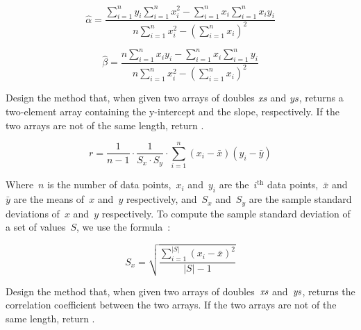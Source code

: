 \[
    \hat\alpha = \frac{\sum_{i=1}^{n}y_i \sum_{i=1}^{n}x_i^2 - \sum_{i=1}^{n}x_i \sum_{i=1}^{n}x_i{}y_i}{n  \sum_{i=1}^{n}x_i^2 - \left(\sum_{i=1}^{n}x_i\right)^2}
\]

\[
    \hat{\beta} = \frac{n \sum_{i=1}^{n}x_i{}y_i - \sum_{i=1}^{n}x_i \sum_{i=1}^{n}y_i}{n \sum_{i=1}^{n}x_i^2 - \left(\sum_{i=1}^{n}x_i\right)^2}
\]

Design the  method that, when given two arrays of doubles $\emph{xs}$ and $\emph{ys}$, returns a two-element array containing the y-intercept and the slope, respectively. If the two arrays are not of the same length, return .


\[
    r = \frac{1}{n-1}\cdot\frac{1}{S_x\cdot{}S_y}\cdot\sum_{i=1}^{n}(x_i - \bar{x})(y_i - \bar{y})  
\]

Where~$n$ is the number of data points,~$x_i$ and~$y_i$ are the~$i^\text{th}$ data points,~$\bar{x}$ and~$\bar{y}$ are the means of~$x$ and~$y$ respectively, and~$S_x$ and~$S_y$ are the sample standard deviations of~$x$ and~$y$ respectively. To compute the sample standard deviation of a set of values~$S$, we use the formula~\citep{stats}:

\[
    S_x = \sqrt{\frac{\sum_{i=1}^{|S|}(x_i - \bar{x})^2}{|S|-1}}
\]

Design the  method that, when given two arrays of doubles~$\emph{xs}$ and~$\emph{ys}$, returns the correlation coefficient between the two arrays. If the two arrays are not of the same length, return .

